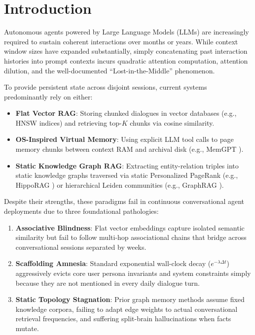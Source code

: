 \documentclass[conference]{IEEEtran}
\begin{document}
\section{Introduction}


Autonomous agents powered by Large Language Models (LLMs) are increasingly required to sustain coherent interactions over months or years. While context window sizes have expanded substantially, simply concatenating past interaction histories into prompt contexts incurs quadratic attention computation, attention dilution, and the well-documented ``Lost-in-the-Middle'' phenomenon.

To provide persistent state across disjoint sessions, current systems predominantly rely on either:
\begin{itemize}
    \item \textbf{Flat Vector RAG}: Storing chunked dialogues in vector databases (e.g., HNSW indices) and retrieving top-$K$ chunks via cosine similarity.
    \item \textbf{OS-Inspired Virtual Memory}: Using explicit LLM tool calls to page memory chunks between context RAM and archival disk (e.g., MemGPT \cite{packer2023memgpt}).
    \item \textbf{Static Knowledge Graph RAG}: Extracting entity-relation triples into static knowledge graphs traversed via static Personalized PageRank (e.g., HippoRAG \cite{gutierrez2024hipporag}) or hierarchical Leiden communities (e.g., GraphRAG \cite{edge2024graphrag}).
\end{itemize}

Despite their strengths, these paradigms fail in continuous conversational agent deployments due to three foundational pathologies:
\begin{enumerate}
    \item \textbf{Associative Blindness}: Flat vector embeddings capture isolated semantic similarity but fail to follow multi-hop associational chains that bridge across conversational sessions separated by weeks.
    \item \textbf{Scaffolding Amnesia}: Standard exponential wall-clock decay ($e^{-\lambda \Delta t}$) aggressively evicts core user persona invariants and system constraints simply because they are not mentioned in every daily dialogue turn.
    \item \textbf{Static Topology Stagnation}: Prior graph memory methods assume fixed knowledge corpora, failing to adapt edge weights to actual conversational retrieval frequencies, and suffering split-brain hallucinations when facts mutate.
\end{enumerate}
\end{document}
